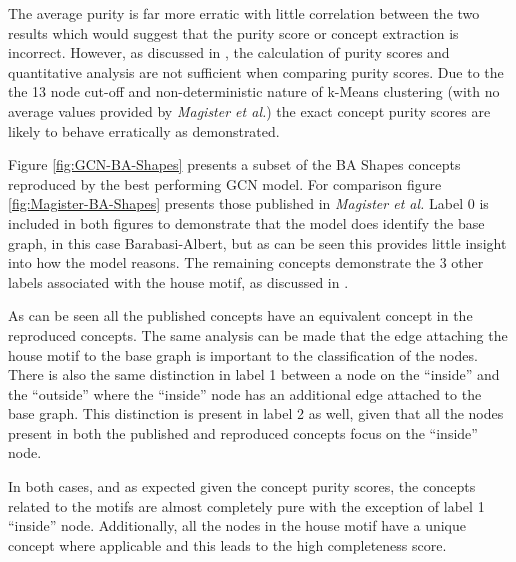 The average purity is far more erratic with little correlation between the two results which would suggest that the purity score or concept extraction is incorrect.
However, as discussed in , the calculation of purity scores and quantitative analysis are not sufficient when comparing purity scores.
Due to the the 13 node cut-off and non-deterministic nature of k-Means clustering (with no average values provided by \textit{Magister et al.}) the exact concept purity scores are likely to behave erratically as demonstrated.



Figure \ref{fig:GCN-BA-Shapes} presents a subset of the BA Shapes concepts reproduced by the best performing GCN model.
For comparison figure \ref{fig:Magister-BA-Shapes} presents those published in \textit{Magister et al.}
Label 0 is included in both figures to demonstrate that the model does identify the base graph, in this case Barabasi-Albert, but as can be seen this provides little insight into how the model reasons.
The remaining concepts demonstrate the 3 other labels associated with the house motif, as discussed in .


As can be seen all the published concepts have an equivalent concept in the reproduced concepts.
The same analysis can be made that the edge attaching the house motif to the base graph is important to the classification of the nodes.
There is also the same distinction in label 1 between a node on the ``inside'' and the ``outside'' where the ``inside'' node has an additional edge attached to the base graph.
This distinction is present in label 2 as well, given that all the nodes present in both the published and reproduced concepts focus on the ``inside'' node.

In both cases, and as expected given the concept purity scores, the concepts related to the motifs are almost completely pure with the exception of label 1 ``inside'' node.
Additionally, all the nodes in the house motif have a unique concept where applicable and this leads to the high completeness score.

